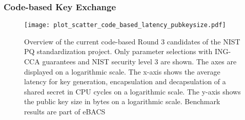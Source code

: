 \subsubsection{Code-based Key Exchange}
\begin{figure}[ht]
    \centering\texttt{[image: plot\_scatter\_code\_based\_latency\_pubkeysize.pdf]}
    \caption{Overview of the current code-based Round 3 candidates of the \acs{NIST} \acs{PQ} standardization project. Only parameter selections with ING-CCA guarantees and \acs{NIST} security level 3 are shown. The axes are displayed on a logarithmic scale. The x-axis shows the average latency for key generation, encapsulation and decapsulation of a shared secret in \acs{CPU} cycles on a logarithmic scale. The y-axis shows the public key size in bytes on a logarithmic scale. Benchmark results are part of eBACS\cite{eBACS}}\label{fig:code_level3_scatter}
\end{figure}

